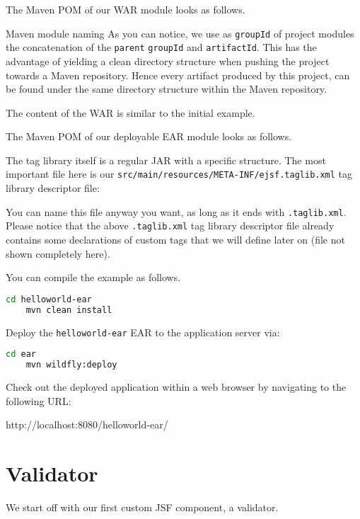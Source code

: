 The Maven POM of our WAR module looks as follows.

\begin{TIP}{Maven module naming}
	As you can notice, we use as \texttt{groupId} of project modules the concatenation
	of the \texttt{parent} \texttt{groupId} and \texttt{artifactId}.
	This has the advantage of yielding a clean directory structure when pushing the project towards a Maven repository.
	Hence every artifact produced by this project, can be found under the same directory structure within the Maven repository.
\end{TIP}

The content of the WAR is similar to the initial example.

The Maven POM of our deployable EAR module looks as follows.


The tag library itself is a regular JAR with a specific structure.
The most important file here is our \texttt{src/main/resources/META-INF/ejsf.taglib.xml} tag library descriptor file:

You can name this file anyway you want, as long as it ends with \texttt{.taglib.xml}.
Please notice that the above \texttt{.taglib.xml} tag library descriptor file already contains some declarations of custom tags that we will define later on (file not shown completely here).

You can compile the example as follows.
\begin{lstlisting}[language=bash]
	cd helloworld-ear
	mvn clean install
\end{lstlisting}

Deploy the \texttt{helloworld-ear} EAR to the application server via:
\begin{lstlisting}[language=bash]
	cd ear
	mvn wildfly:deploy
\end{lstlisting}

Check out the deployed application within a web browser by navigating to the following URL:

http://localhost:8080/helloworld-ear/

\section{Validator}
\label{sec:validator}
We start off with our first custom JSF component, a validator.


